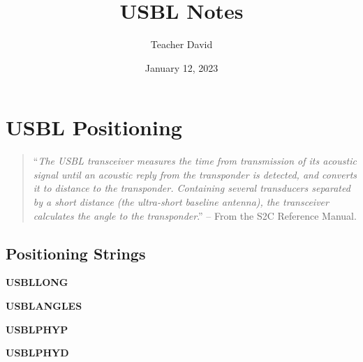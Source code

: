 \documentclass[11pt, oneside]{article}   	%
\title{USBL Notes}
\author{Teacher David}
\date{January 12, 2023}							%
\begin{document}
\maketitle

\section{USBL Positioning}
\begin{quotation}
``\emph{The USBL transceiver measures the time from transmission of its acoustic signal until an acoustic reply from the transponder is detected, and converts it to distance to the transponder. Containing several transducers separated by a short distance (the ultra-short baseline antenna), the transceiver calculates the angle to the transponder}.'' -- From the S2C Reference Manual.
\end{quotation}

\subsection{Positioning Strings}

\textbf{USBLLONG}

\textbf{USBLANGLES}


\textbf{USBLPHYP}

\textbf{USBLPHYD}
\end{document}

